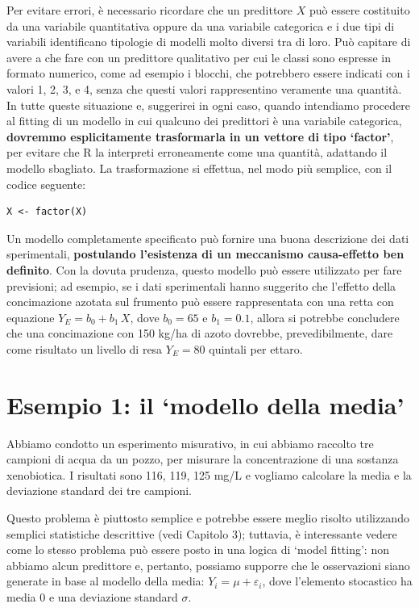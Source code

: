 \documentclass[
  12pt,
]{book}
\begin{document}
Per evitare errori, è necessario ricordare che un predittore \(X\) può essere costituito da una variabile quantitativa oppure da una variabile categorica e i due tipi di variabili identificano tipologie di modelli molto diversi tra di loro. Può capitare di avere a che fare con un predittore qualitativo per cui le classi sono espresse in formato numerico, come ad esempio i blocchi, che potrebbero essere indicati con i valori 1, 2, 3, e 4, senza che questi valori rappresentino veramente una quantità. In tutte queste situazione e, suggerirei in ogni caso, quando intendiamo procedere al fitting di un modello in cui qualcuno dei predittori è una variabile categorica, \textbf{dovremmo esplicitamente trasformarla in un vettore di tipo `factor'}, per evitare che R la interpreti erroneamente come una quantità, adattando il modello sbagliato. La trasformazione si effettua, nel modo più semplice, con il codice seguente:

\begin{verbatim}
X <- factor(X)
\end{verbatim}

Un modello completamente specificato può fornire una buona descrizione dei dati sperimentali, \textbf{postulando l'esistenza di un meccanismo causa-effetto ben definito}. Con la dovuta prudenza, questo modello può essere utilizzato per fare previsioni; ad esempio, se i dati sperimentali hanno suggerito che l'effetto della concimazione azotata sul frumento può essere rappresentata con una retta con equazione \(Y_E = b_0 + b_1 \, X\), dove \(b_0 = 65\) e \(b_1 = 0.1\), allora si potrebbe concludere che una concimazione con 150 kg/ha di azoto dovrebbe, prevedibilmente, dare come risultato un livello di resa \(Y_E = 80\) quintali per ettaro.

\hypertarget{esempio-1-il-modello-della-media}{%
\section{Esempio 1: il `modello della media'}\label{esempio-1-il-modello-della-media}}

Abbiamo condotto un esperimento misurativo, in cui abbiamo raccolto tre campioni di acqua da un pozzo, per misurare la concentrazione di una sostanza xenobiotica. I risultati sono 116, 119, 125 mg/L e vogliamo calcolare la media e la deviazione standard dei tre campioni.

Questo problema è piuttosto semplice e potrebbe essere meglio risolto utilizzando semplici statistiche descrittive (vedi Capitolo 3); tuttavia, è interessante vedere come lo stesso problema può essere posto in una logica di `model fitting': non abbiamo alcun predittore e, pertanto, possiamo supporre che le osservazioni siano generate in base al modello della media: \(Y_i = \mu + \varepsilon_i\), dove l'elemento stocastico ha media 0 e una deviazione standard \(\sigma\).
\end{document}
